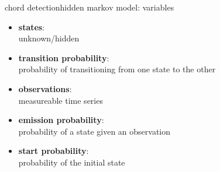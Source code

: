         \begin{frame}{chord detection}{hidden markov model: variables}
            \begin{itemize}
                \item	\textbf{states}:\\ unknown/hidden
                \smallskip
                \item	\textbf{transition probability}:\\ probability of transitioning from one state to the other
                \smallskip
                \item   \textbf{observations}:\\ measureable time series
                \smallskip
                \item	\textbf{emission probability}:\\ probability of a state given an observation
                \smallskip
                \item	\textbf{start probability}:\\ probability of the initial state
            \end{itemize}
        \end{frame}
